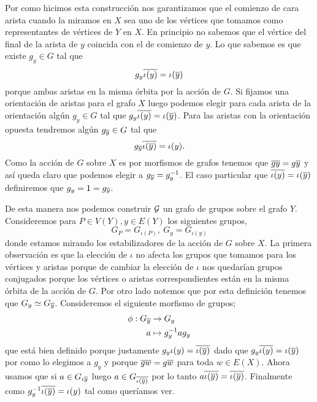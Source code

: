 \documentclass[tesis.tex]{subfiles}
\begin{document}
Por como hicimos esta construcción nos garantizamos que el comienzo de cara arista cuando la miramos en $X$ sea uno de los vértices que tomamos como representantes de vértices de $Y$ en $X$.
En principio no sabemos que el vértice del final de la arista de $y$ coincida con el de comienzo de $y$. 
Lo que sabemos es que existe $g_y \in G$ tal que 
\[
	g_y \overline{\iota (y)} = \iota (\overline y)
\]
porque ambas aristas en la misma órbita por la acción de $G$.
Si fijamos una orientación de aristas para el grafo $X$ luego podemos elegir para cada arista de la orientación algún $g_y \in G$ tal que $g_y \overline{\iota (y)} = \iota (\overline y)$.
Para las aristas con la orientación opuesta tendremos algún $g_{\overline y} \in G$ tal que 
\[
	g_{\overline y} \overline{\iota(\overline y)} = \iota(y).
\]
Como la acción de $G$ sobre $X$ es por morfismos de grafos tenemos que $\overline {g y} = g \overline y$ y así queda claro que podemos elegir a $g_{\overline y} = g_{y}^{-1}$.
El caso particular que $\overline{\iota (y)} = \iota (\overline y)$ definiremos que $g_y = 1 = g_{\overline y}$.

De esta manera nos podemos construir ${\cal G}$ un grafo de grupos sobre el grafo $Y$.
Consideremos para $P \in V(Y), y \in E(Y)$ los siguientes grupos,
\[
	G_P = G_{\iota (P)}, \ G_y = G_{\iota(y)}
\]
donde estamos mirando los estabilizadores de la acción de $G$ sobre $X$.
La primera observación es que la elección de $\iota$ no afecta los grupos que tomamos para los vértices y aristas porque de cambiar la elección de $\iota$ nos quedarían grupos conjugados porque los vértices o aristas correspondientes están en la misma órbita de la acción de $G$.
Por otro lado notemos que por esta definición tenemos que $G_y \simeq G_{\overline y}$.
Consideremos el siguiente morfismo de grupos;
\begin{align*}
	\phi: G_{\overline y} &\to G_{y} \\
	a &\mapsto g_{y}^{-1}ag_{y}
\end{align*}
que está bien definido porque justamente $g_y \iota(y) = \overline{\iota(\overline y)}$ dado que $g_y \overline{\iota(y)} = \iota (\overline y)$ por como lo elegimos a $g_y$ y porque $\overline{gw} = g \overline w$ para toda $w \in E(X)$.
Ahora usamos que si $a \in G_{\iota{\overline y}}$ luego $a \in G_{\overline{\iota(\overline y)}}$ por lo tanto $a \overline{\iota(\overline y)} = \overline{\iota(\overline y)} $.
Finalmente como $ g_{y}^{-1} \overline {\iota (\overline y) } = \iota (y)$ tal como queríamos ver.
\end{document}

